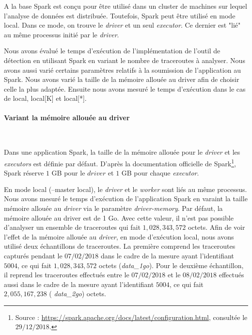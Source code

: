 A la base Spark est conçu pour être utilisé dans un cluster de machines sur  lequel l'analyse de données est distribuée. Toutefois, Spark peut être utilisé en mode local. Dans ce mode, on trouve le \textit{driver} et un seul \textit{executor}. Ce dernier est "lié" au même processus initié par le \textit{driver}. 


Nous avons évalué le temps d'exécution de l'implémentation de l'outil de détection en utilisant Spark en variant le nombre de traceroutes à analyser. Nous avons aussi varié certains paramètres relatifs à la soumission de l'application au Spark. Nous avons varié la taille de la mémoire allouée au driver afin de choisir celle la plus adaptée. Ensuite nous avons mesuré le temps d'exécution dans le cas de local, local[K] et local[*].

\begin{figure}[H]
	\centering
	\captionsetup{justification=centering}
	\resizebox{\textwidth}{!}{
		
	}
	\caption{ }
	\label{fig:sparktimingLocal}
\end{figure}


\paragraph{Variant la mémoire allouée au driver}~

Dans une application Spark, la taille de la mémoire allouée pour le \textit{driver} et les \textit{executors} est  définie par défaut. D'après la documentation officielle de Spark\footnote{Source : \url{https://spark.apache.org/docs/latest/configuration.html}, consultée le $29/12/2018$.}, Spark réserve $ 1 $ GB pour le $ driver $ et $ 1 $ GB pour chaque \textit{executor}. 

En mode local (--master local), le \textit{driver} et le \textit{worker} sont liés au même processus.  Nous avons mesuré le temps d'exécution de l'application Spark en varaint la taille mémoire allouée au \textit{driver} via le paramètre \textit{driver-memory}. Par défaut, la mémoire allouée au driver est de 1 Go. Avec cette valeur, il n'est pas possible  d'analyser un ensemble de traceroutes qui fait $ 1,028,343,572 $ octets. Afin de voir l'effet de la mémoire allouée au \textit{driver}, en mode d'exécution local, nous avons utilisé deux échantillons de traceroutes. La première comprend les traceroutes capturés pendant le $ 07/02/2018 $ dans le cadre de la mesure ayant l'identifiant $ 5004 $, ce qui fait $ 1,028,343,572 $ octets (\textit{data\_1go}). Pour le deuxième échantillon, il reprend les traceroutes effectués  entre le $ 07/02/2018 $ et le $ 08/02/2018 $ effectués aussi dans le cadre de la mesure ayant l'identifiant $ 5004 $, ce qui fait $ 2,055,167,238 $ (\textit{ data\_2go}) octets.

